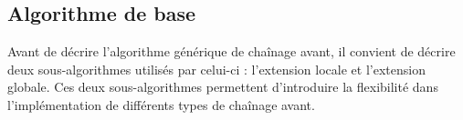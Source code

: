 

\subsection{Algorithme de base}\label{subsec:algo_base_ch_avant}


Avant de décrire l'algorithme générique de chaînage avant, il convient de décrire deux sous-algorithmes utilisés par celui-ci : l'extension locale et l'extension globale. Ces deux sous-algorithmes permettent d'introduire la flexibilité dans l'implémentation de différents types de chaînage avant.

